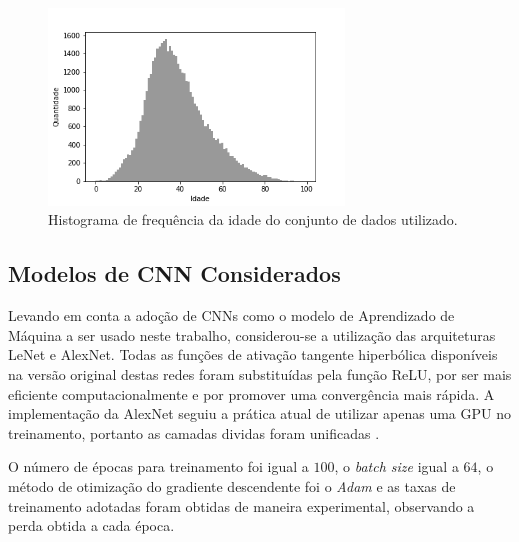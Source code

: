 \begin{figure}
    \centering
     \includegraphics[width=0.7\textwidth]{img/idade_hist_clean}
     \caption{Histograma de frequência da idade do conjunto de dados utilizado.}
     \label{fig:hist}
\end{figure}

\subsection{Modelos de CNN Considerados}

Levando em conta a adoção de CNNs como o modelo de Aprendizado de Máquina a ser usado neste trabalho, considerou-se a utilização das arquiteturas LeNet e AlexNet. Todas as funções de ativação tangente hiperbólica disponíveis na versão original destas redes foram substituídas pela função ReLU, por ser mais eficiente computacionalmente e por promover uma convergência mais rápida. A implementação da AlexNet seguiu a prática atual de utilizar apenas uma GPU no treinamento, portanto as camadas dividas foram unificadas .

O número de épocas para treinamento foi igual a $100$, o \emph{batch size} igual a $64$, o método de otimização do gradiente descendente foi o \emph{Adam} e as taxas de treinamento adotadas foram obtidas de maneira experimental, observando a perda obtida a cada época.
